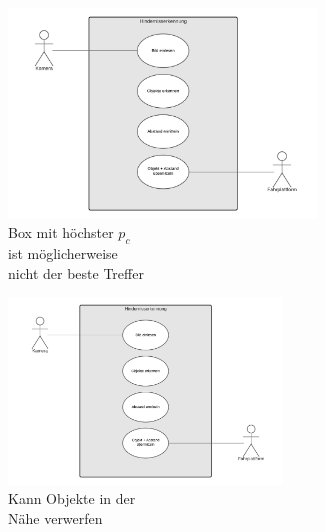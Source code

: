 \begin{figure}[H]
	\begin{subfigure}[t]{0.35\textwidth}	
		\centering
		\includegraphics[width=0.9\textwidth]{chapters/cheatsheet/images/UseCaseNeu.png}
		\caption[Box mit höchster $p_{c}$ ist möglicherweise nicht der beste Treffer - Bildquelle: \cite{quickintro}]{Box mit höchster $p_{c}$\\ ist möglicherweise\\ nicht der beste Treffer \cite{quickintro}}
		\label{fig:rasteryolo1a}
	\end{subfigure}%
	\begin{subfigure}[t]{0.35\textwidth}
		\centering
		\includegraphics[width=0.8\textwidth]{chapters/cheatsheet/images/UseCaseNeu.png}
		\caption[Kann Objekte in der Nähe verwerfen - Bildquelle: \cite{quickintro}]{Kann Objekte in der\\ Nähe verwerfen \cite{quickintro}}
		\label{fig:rasteryolo1b}
	\end{subfigure}%
	\begin{subfigure}[t]{0.35\textwidth}
		\centering

\end{subfigure}
\end{figure}
